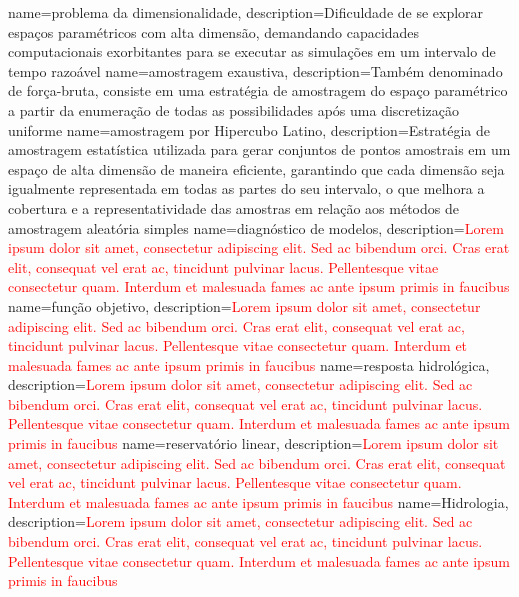 {
    name=problema da dimensionalidade,
    description={Dificuldade de se explorar espaços paramétricos com alta dimensão, demandando capacidades computacionais exorbitantes para se executar as simulações em um intervalo de tempo razoável}
}
{
    name=amostragem exaustiva,
    description={Também denominado de força-bruta, consiste em uma estratégia de amostragem do espaço paramétrico a partir da enumeração de todas as possibilidades após uma discretização uniforme}
}
{
    name=amostragem por Hipercubo Latino,
    description={Estratégia de amostragem estatística utilizada para gerar conjuntos de pontos amostrais em um espaço de alta dimensão de maneira eficiente, garantindo que cada dimensão seja igualmente representada em todas as partes do seu intervalo, o que melhora a cobertura e a representatividade das amostras em relação aos métodos de amostragem aleatória simples}
}
{
    name=diagnóstico de modelos,
    description={\textcolor{red}{Lorem ipsum dolor sit amet, consectetur adipiscing elit. Sed ac bibendum orci. Cras erat elit, consequat vel erat ac, tincidunt pulvinar lacus. Pellentesque vitae consectetur quam. Interdum et malesuada fames ac ante ipsum primis in faucibus}}
}
{
    name=função objetivo,
    description={\textcolor{red}{Lorem ipsum dolor sit amet, consectetur adipiscing elit. Sed ac bibendum orci. Cras erat elit, consequat vel erat ac, tincidunt pulvinar lacus. Pellentesque vitae consectetur quam. Interdum et malesuada fames ac ante ipsum primis in faucibus}}
}
{
    name=resposta hidrológica,
    description={\textcolor{red}{Lorem ipsum dolor sit amet, consectetur adipiscing elit. Sed ac bibendum orci. Cras erat elit, consequat vel erat ac, tincidunt pulvinar lacus. Pellentesque vitae consectetur quam. Interdum et malesuada fames ac ante ipsum primis in faucibus}}
}
{
    name=reservatório linear,
    description={\textcolor{red}{Lorem ipsum dolor sit amet, consectetur adipiscing elit. Sed ac bibendum orci. Cras erat elit, consequat vel erat ac, tincidunt pulvinar lacus. Pellentesque vitae consectetur quam. Interdum et malesuada fames ac ante ipsum primis in faucibus}}
}
{
    name=Hidrologia,
    description={\textcolor{red}{Lorem ipsum dolor sit amet, consectetur adipiscing elit. Sed ac bibendum orci. Cras erat elit, consequat vel erat ac, tincidunt pulvinar lacus. Pellentesque vitae consectetur quam. Interdum et malesuada fames ac ante ipsum primis in faucibus}}
}
